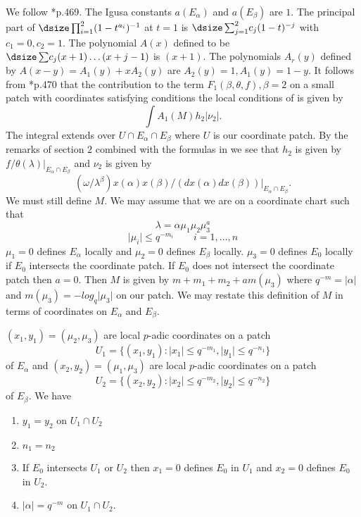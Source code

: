 \documentclass{memo-l}
\theoremstyle{definition}
\theoremstyle{remark}
\numberwithin{section}{chapter}
\numberwithin{equation}{chapter}
\begin{document}
   We follow \cite{MR701566}*{p.469}.  The Igusa constants $a(E_{{\alpha}})$ and
$a(E_{{\beta}})$ are $1$.  The principal part of ${\dsize\prod^2_{i=1}}
(1-t^{a_i})^{-1}$ at $t = 1$ is ${\dsize\sum^2_{j=1}}
c_{j}(1-t)^{-j}$ with $c_{1} = 0, c_{2} = 1$.  The polynomial $A(x)$ defined to
be ${\dsize\sum} c_{j}(x+1)\ldots (x+j-1)$ is $(x+1)$.  The polynomials
$A_{r}(y)$ defined by $A(x-y)  =  A_{1}(y) + xA_{2}(y)$ are $A_{2}(y) = 1,
A_{1}(y)  =  1-y$.  It follows from \cite{MR701566}*{p.470} that the contribution
to the term $F_{1}({\beta},{\theta},f), {\beta} = 2$ on a small patch with
coordinates satisfying conditions the local conditions of \cite{MR701566} is given
by
$$
\int A_{1}(M)h_{2}\vert {\nu}_{2}\vert .
$$
The integral extends over $U \cap E_{{\alpha}} \cap E_{{\beta}}$ where
$U$ is our coordinate patch.  By the remarks of section $2$ combined with
the formulas in \cite{MR701566} we see that $h_{2}$ is given by
$f/{\theta}({\lambda}) \vert_{E_{{\alpha}} \cap E_{{\beta}}}$ and
${\nu}_{2}$ is given by
$$
({\omega}/{\lambda}^{{\beta}})x({\alpha})x({\beta})/(dx({\alpha})dx({\beta}))
\vert_{E_{{\alpha}} \cap E_{{\beta}}} .
$$
We must still define $M$.  We may assume that we are on a coordinate chart
such that
$$
{\lambda}  =  {\alpha}{\mu}_{1}{\mu}_{2}{\mu}_{3}^{a}
$$
$$
\vert {\mu}_{i}\vert \le q^{-m_{i}} \qquad i  =  1,\ldots ,n
$$
${\mu}_{1} = 0$ defines $E_{{\alpha}}$ locally and ${\mu}_{2} = 0$ defines
$E_{{\beta}}$ locally.  ${\mu}_{3} = 0$ defines $E_{0}$ locally if $E_{0}$
intersects the coordinate patch.  If $E_{0}$ does not intersect the
coordinate patch then $a = 0$.  Then $M$ is given by $m + m_{1} + m_{2} +
am({\mu}_{3})$ where $q^{-m}  =  \vert {\alpha}\vert$ and $m({\mu}_{3})  =
-log_{q}\vert {\mu}_{3}\vert$ on our patch.  We may restate this definition
of $M$ in terms of coordinates on $E_{{\alpha}}$ and $E_{{\beta}}$.

   $(x_{1},y_{1})  =  ({\mu}_{2},{\mu}_{3})$ are local $p$-adic coordinates
on a patch
$$
U_{1}  =  \{(x_{1},y_{1}): \vert x_{1}\vert \le q^{-m_{1}},
\vert y_{1}\vert \le q^{-n_{1}} \}
$$
of $E_{{\alpha}}$ and $(x_{2},y_{2})  =  ({\mu}_{1},{\mu}_{3})$ are local
$p$-adic coordinates on a patch
$$
U_{2}  =  \{(x_{2},y_{2}): \vert x_{2}\vert \le q^{-m_{2}}, \vert
y_{2}\vert \le q^{-n_{2}} \}
$$
of $E_{{\beta}}$.  We have

\medskip
\begin{enumerate}[label=A.\roman*)]
\item $y_{1} = y_{2}$ on $U_{1} \cap U_{2}$
\item $n_{1}  =  n_{2}$
\item If $E_{0}$ intersects $U_{1}$ or $U_{2}$ then $x_{1} = 0$ defines
$E_{0}$ in $U_{1}$ and $x_{2} = 0$ defines $E_{0}$ in $U_{2}$.
\item $\vert {\alpha}\vert = q^{-m}$ on $U_{1} \cap U_{2}$.
\end{enumerate}
\end{document}
